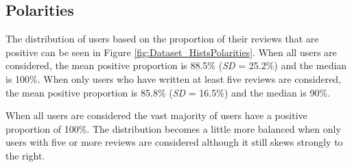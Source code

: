 \subsection{Polarities}

The distribution of users based on the proportion of their reviews that are positive can be seen in Figure \ref{fig:Dataset_HistsPolarities}. When all users are considered, the mean positive proportion is 88.5\% (\textit{SD} = 25.2\%) and the median is 100\%. When only users who have written at least five reviews are considered, the mean positive proportion is 85.8\% (\textit{SD} = 16.5\%) and the median is 90\%.

When all users are considered the vast majority of users have a positive proportion of 100\%. The distribution becomes a little more balanced when only users with five or more reviews are considered although it still skews strongly to the right.

